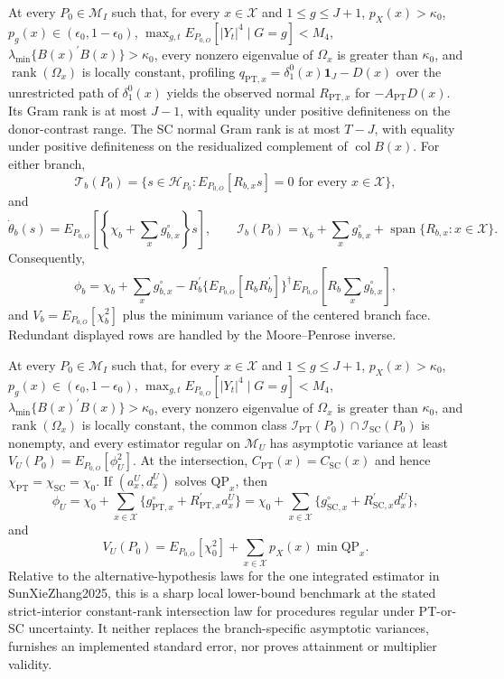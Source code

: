 At every \(P_0\in\mathcal M_I\) such that, for every \(x\in\mathcal X\) and \(1\le g\le J+1\), \(p_X(x)>\kappa_0\), \(p_g(x)\in(\epsilon_0,1-\epsilon_0)\), \(\max_{g,t}E_{P_{0,O}}[|Y_t|^4\mid G=g]<M_4\), \(\lambda_{\min}\{B(x)^{\prime}B(x)\}>\kappa_0\), every nonzero eigenvalue of \(\Omega_x\) is greater than \(\kappa_0\), and \(\operatorname{rank}(\Omega_x)\) is locally constant, profiling \(q_{\mathrm{PT},x}=\delta_1^0(x)\mathbf 1_J-D(x)\) over the unrestricted path of \(\delta_1^0(x)\) yields the observed normal \(R_{\mathrm{PT},x}\) for \(-A_{\mathrm{PT}}D(x)\). Its Gram rank is at most \(J-1\), with equality under positive definiteness on the donor-contrast range. The SC normal Gram rank is at most \(T-J\), with equality under positive definiteness on the residualized complement of \(\operatorname{col}B(x)\). For either branch,
\[
\mathcal T_b(P_0)=\{s\in\mathcal H_{P_0}:E_{P_{0,O}}[R_{b,x}s]=0\text{ for every }x\in\mathcal X\},
\]
and
\[
\dot\theta_b(s)=E_{P_{0,O}}\!\left[\left\{\chi_b+\sum_xg^{\circ}_{b,x}\right\}s\right],
\qquad
\mathcal I_b(P_0)=\chi_b+\sum_xg^{\circ}_{b,x}+\operatorname{span}\{R_{b,x}:x\in\mathcal X\}.
\]
Consequently,
\[
\phi_b=\chi_b+\sum_xg^{\circ}_{b,x}-R_b^{\prime}\{E_{P_{0,O}}[R_bR_b^{\prime}]\}^{\dagger}E_{P_{0,O}}\!\left[R_b\sum_xg^{\circ}_{b,x}\right],
\]
and \(V_b=E_{P_{0,O}}[\chi_b^2]\) plus the minimum variance of the centered branch face. Redundant displayed rows are handled by the Moore--Penrose inverse.

At every \(P_0\in\mathcal M_I\) such that, for every \(x\in\mathcal X\) and \(1\le g\le J+1\), \(p_X(x)>\kappa_0\), \(p_g(x)\in(\epsilon_0,1-\epsilon_0)\), \(\max_{g,t}E_{P_{0,O}}[|Y_t|^4\mid G=g]<M_4\), \(\lambda_{\min}\{B(x)^{\prime}B(x)\}>\kappa_0\), every nonzero eigenvalue of \(\Omega_x\) is greater than \(\kappa_0\), and \(\operatorname{rank}(\Omega_x)\) is locally constant, the common class \(\mathcal I_{\mathrm{PT}}(P_0)\cap\mathcal I_{\mathrm{SC}}(P_0)\) is nonempty, and every estimator regular on \(\mathcal M_U\) has asymptotic variance at least \(V_U(P_0)=E_{P_{0,O}}[\phi_U^2]\). At the intersection, \(C_{\mathrm{PT}}(x)=C_{\mathrm{SC}}(x)\) and hence \(\chi_{\mathrm{PT}}=\chi_{\mathrm{SC}}=\chi_0\). If \((a_x^U,d_x^U)\) solves \(\mathrm{QP}_x\), then
\[
\phi_U=\chi_0+\sum_{x\in\mathcal X}\{g^{\circ}_{\mathrm{PT},x}+R_{\mathrm{PT},x}^{\prime}a_x^U\}
=\chi_0+\sum_{x\in\mathcal X}\{g^{\circ}_{\mathrm{SC},x}+R_{\mathrm{SC},x}^{\prime}d_x^U\},
\]
and
\[
V_U(P_0)=E_{P_{0,O}}[\chi_0^2]+\sum_{x\in\mathcal X}p_X(x)\min\mathrm{QP}_x.
\]
Relative to the alternative-hypothesis laws for the one integrated estimator in SunXieZhang2025, this is a sharp local lower-bound benchmark at the stated strict-interior constant-rank intersection law for procedures regular under PT-or-SC uncertainty. It neither replaces the branch-specific asymptotic variances, furnishes an implemented standard error, nor proves attainment or multiplier validity.

